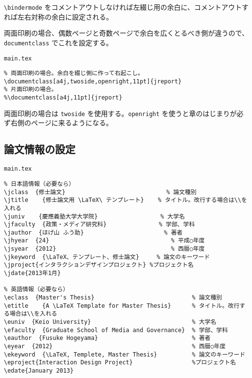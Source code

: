 \verb|\bindermode| をコメントアウトしなければ左綴じ用の余白に、コメントアウトすれば左右対称の余白に設定される。

両面印刷の場合、偶数ページと奇数ページで余白を広くとるべき側が違うので、\verb|documentclass| でこれを設定する。

\begin{itembox}[l]{{\tt main.tex}}
\begin{verbatim}
% 両面印刷の場合。余白を綴じ側に作って右起こし。
\documentclass[a4j,twoside,openright,11pt]{jreport}
% 片面印刷の場合。
%\documentclass[a4j,11pt]{jreport}
\end{verbatim}
\end{itembox}

両面印刷の場合は \verb|twoside| を使用する。\verb|openright| を使うと章のはじまりが必ず右側のページに来るようになる。

\subsection{論文情報の設定}
\label{sec:meta}

\begin{itembox}[l]{{\tt main.tex}}
\begin{verbatim}
% 日本語情報（必要なら）
\jclass  {修士論文}                             % 論文種別
\jtitle    {修士論文用 \LaTeX\ テンプレート}    % タイトル。改行する場合は\\を入れる
\juniv    {慶應義塾大学大学院}                  % 大学名
\jfaculty  {政策・メディア研究科}               % 学部、学科
\jauthor  {ほげ山 ふう助}                       % 著者
\jhyear  {24}                                   % 平成○年度
\jsyear  {2012}                                 % 西暦○年度
\jkeyword  {\LaTeX、テンプレート、修士論文}     % 論文のキーワード
\jproject{インタラクションデザインプロジェクト} %プロジェクト名
\jdate{2013年1月}

% 英語情報（必要なら）
\eclass  {Master's Thesis}                            % 論文種別
\etitle    {A \LaTeX Template for Master Thesis}      % タイトル。改行する場合は\\を入れる
\euniv  {Keio University}                             % 大学名
\efaculty  {Graduate School of Media and Governance}  % 学部、学科
\eauthor  {Fusuke Hogeyama}                           % 著者
\eyear  {2012}                                        % 西暦○年度
\ekeyword  {\LaTeX, Templete, Master Thesis}          % 論文のキーワード
\eproject{Interaction Design Project}                 %プロジェクト名
\edate{January 2013}
\end{verbatim}
\end{itembox}

